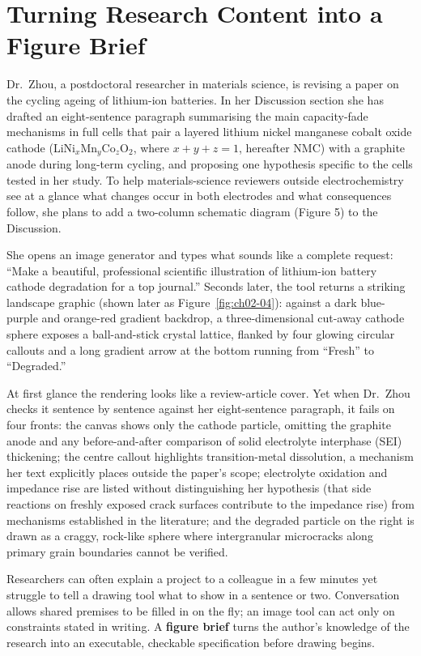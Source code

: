 \chapter{Turning Research Content into a Figure Brief}

Dr.\ Zhou, a postdoctoral researcher in materials science, is revising a paper on the cycling ageing of lithium-ion batteries. In her Discussion section she has drafted an eight-sentence paragraph summarising the main capacity-fade mechanisms in full cells that pair a layered lithium nickel manganese cobalt oxide cathode (LiNi$_x$Mn$_y$Co$_z$O$_2$, where $x+y+z=1$, hereafter NMC) with a graphite anode during long-term cycling, and proposing one hypothesis specific to the cells tested in her study. To help materials-science reviewers outside electrochemistry see at a glance what changes occur in both electrodes and what consequences follow, she plans to add a two-column schematic diagram (Figure 5) to the Discussion.

She opens an image generator and types what sounds like a complete request: ``Make a beautiful, professional scientific illustration of lithium-ion battery cathode degradation for a top journal.'' Seconds later, the tool returns a striking landscape graphic (shown later as Figure~\ref{fig:ch02-04}): against a dark blue-purple and orange-red gradient backdrop, a three-dimensional cut-away cathode sphere exposes a ball-and-stick crystal lattice, flanked by four glowing circular callouts and a long gradient arrow at the bottom running from ``Fresh'' to ``Degraded.''

At first glance the rendering looks like a review-article cover. Yet when Dr.\ Zhou checks it sentence by sentence against her eight-sentence paragraph, it fails on four fronts: the canvas shows only the cathode particle, omitting the graphite anode and any before-and-after comparison of solid electrolyte interphase (SEI) thickening; the centre callout highlights transition-metal dissolution, a mechanism her text explicitly places outside the paper's scope; electrolyte oxidation and impedance rise are listed without distinguishing her hypothesis (that side reactions on freshly exposed crack surfaces contribute to the impedance rise) from mechanisms established in the literature; and the degraded particle on the right is drawn as a craggy, rock-like sphere where intergranular microcracks along primary grain boundaries cannot be verified.

Researchers can often explain a project to a colleague in a few minutes yet struggle to tell a drawing tool what to show in a sentence or two. Conversation allows shared premises to be filled in on the fly; an image tool can act only on constraints stated in writing. A \textbf{figure brief} turns the author's knowledge of the research into an executable, checkable specification before drawing begins.

